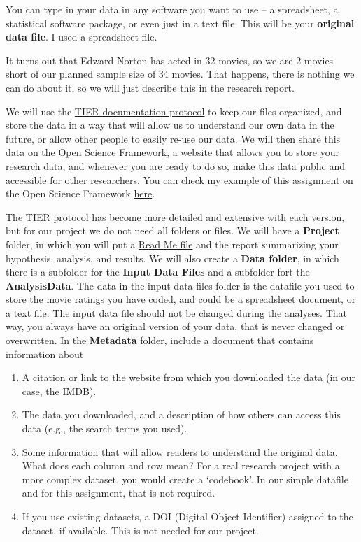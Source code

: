 \documentclass[
  oneside]{book}
\begin{document}
You can type in your data in any software you want to use -- a spreadsheet, a
statistical software package, or even just in a text file. This will be your
\textbf{original data file}. I used a spreadsheet file.

It turns out that Edward Norton has acted in 32 movies, so we are 2 movies short
of our planned sample size of 34 movies. That happens, there is nothing we can
do about it, so we will just describe this in the research report.

We will use the \href{https://www.projecttier.org/tier-protocol/}{TIER documentation
protocol} to keep our files
organized, and store the data in a way that will allow us to understand our own
data in the future, or allow other people to easily re-use our data. We
will then share this data on the \href{http://www.osf.io}{Open Science Framework}, a
website that allows you to store your research data, and whenever you are ready
to do so, make this data public and accessible for other researchers. You can
check my example of this assignment on the Open Science Framework
\href{https://osf.io/r4hab/}{here}.

The TIER protocol has become more detailed and extensive with each version, but for our project we do not need all folders or files. We will have a \textbf{Project} folder, in which you will put a \href{https://www.projecttier.org/tier-protocol/protocol-4-0/root/readme/}{Read Me file} and the report summarizing your hypothesis, analysis, and results. We will also create a \textbf{Data folder}, in which there is a subfolder for the \textbf{Input Data Files} and a subfolder fort the \textbf{AnalysisData}. The data in the input data files folder is the datafile you used to store the movie ratings you have coded, and could be a spreadsheet document, or a text file. The input data file should not be changed during the analyses. That way, you always have an original version of your data, that is never changed or overwritten. In the \textbf{Metadata} folder, include a document that contains information about

\begin{enumerate}
\def\labelenumi{\arabic{enumi}.}
\item
  A citation or link to the website from which you downloaded the data (in our case, the IMDB).
\item
  The data you downloaded, and a description of how others can access this data (e.g., the search terms you used).
\item
  Some information that will allow readers to understand the original data. What does each column and row mean? For a real research project with a more complex dataset, you would create a `codebook'. In our simple datafile and for this assignment, that is not required.
\item
  If you use existing datasets, a DOI (Digital Object Identifier) assigned to the dataset, if available. This is not needed for our project.
\end{enumerate}
\end{document}
